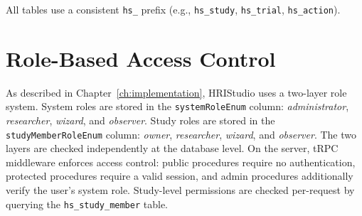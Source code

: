 All tables use a consistent \texttt{hs\_} prefix (e.g., \texttt{hs\_study}, \texttt{hs\_trial}, \texttt{hs\_action}).

\section{Role-Based Access Control}

As described in Chapter~\ref{ch:implementation}, HRIStudio uses a two-layer role system. System roles are stored in the \texttt{systemRoleEnum} column: \emph{administrator}, \emph{researcher}, \emph{wizard}, and \emph{observer}. Study roles are stored in the \texttt{studyMemberRoleEnum} column: \emph{owner}, \emph{researcher}, \emph{wizard}, and \emph{observer}. The two layers are checked independently at the database level. On the server, tRPC middleware enforces access control: public procedures require no authentication, protected procedures require a valid session, and admin procedures additionally verify the user's system role. Study-level permissions are checked per-request by querying the \texttt{hs\_study\_member} table.
